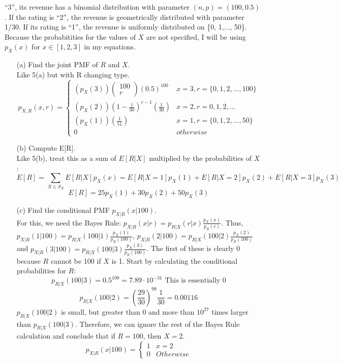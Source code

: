 \documentclass{report}
\begin{document}
\begin{enumerate}
“3”, its revenue has a binomial distribution with parameter $(n, p) = (100, 0.5)$. If the rating is “2”, the
revenue is geometrically distributed with parameter 1/30. If its rating is “1”, the revenue is uniformly
distributed on \{0, 1,..., 50\}.\\
Because the probabitities for the values of $X$ are not specified, I will be using $p_X(x)$ for $x \in [1,2,3]$ in my equations.
\begin{itemize}
\item[(a)] Find the joint PMF of $R$ and $X$.\\
Like 5(a) but with R changing type.
$$ p_{X,R}(x,r) = \left. \begin{cases}
(p_X(3))\left(\!
    \begin{array}{c}
      100 \\
      r
    \end{array}
  \!\right)(0.5)^{100} & x= 3, r = \{0,1,2,...,100\} \\
(p_X(2))(1-\frac{1}{30})^{r-1}(\frac{1}{30}) & x = 2, r = 0,1,2,... \\
(p_X(1))(\frac{1}{51}) & x = 1, r = \{0,1,2,...,50\} \\
0 & otherwise
\end{cases} \right.$$
\item[(b)] Compute E[R].\\
Like 5(b), treat this as a sum of $E[R|X]$ multiplied by the probabilities of $X$:
$$E[R] = \sum_{X \in S_X} E[R|X]p_X(x) = E[R|X=1]p_X(1)+ E[R|X=2]p_X(2)+ E[R|X=3]p_X(3)$$
$$E[R] = 25p_X(1) + 30p_X(2) + 50p_X(3)  $$
\item[(c)] Find the conditional PMF $p_{X|R}(x|100)$. \\
For this, we need the Bayes Rule: $p_{X|R}(x|r) = p_{R|X}(r|x)\frac{p_X(x)}{p_R(r)}$. Thus,$p_{X|R}(1|100) = p_{R|X}(100|1)\frac{p_X(1)}{p_R(100)}$, $p_{X|R}(2|100) = p_{R|X}(100|2)\frac{p_X(2)}{p_R(100)}$ and $p_{X|R}(3|100) = p_{R|X}(100|3)\frac{p_X(3)}{p_R(100)}$.
The first of these is clearly 0 because $R$ cannot be 100 if $X$ is 1. Start by calculating the conditional probabilities for $R$:
$$p_{R|X}(100|3) = 0.5^{100} = 7.89 \cdot 10^{-31} \text{ This is essentially 0}$$
$$p_{R|X}(100|2) = (\frac{29}{30})^{99}\frac{1}{30} = 0.00116$$
 $p_{R|X}(100|2)$ is small, but greater than 0 and more than $10^{27}$ times larger than $p_{R|X}(100|3)$. Therefore, we can ignore the rest of the Bayes Rule calculation and conclude that if $R=100$, then $X=2$.
 $$p_{X|R}(x|100) = \left. \begin{cases}
 1 & x=2 \\
 0 & Otherwise
 \end{cases} \right.$$


\end{itemize}
\end{enumerate}

 
\end{document}
